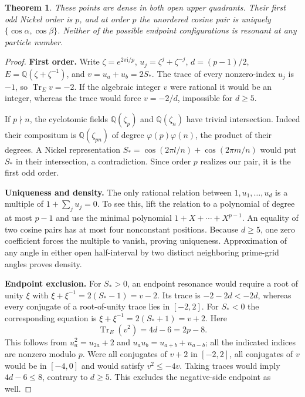 \documentclass[11pt]{article}
\numberwithin{equation}{section}
\newtheorem{theorem}{Theorem}[section]
\theoremstyle{definition}
\newcommand{\ii}{\mathrm i}
\newcommand{\Q}{\mathbb Q}
\begin{document}
\begin{theorem}\label{thm:prime}
These points are dense in both open upper quadrants. Their first
odd Nickel order is $p$, and at order $p$ the unordered cosine
pair is uniquely $\{\cos\alpha,\cos\beta\}$. Neither of the
possible endpoint configurations is resonant at any particle number.
\end{theorem}
\begin{proof}
\noindent\textbf{First order.} Write $\zeta=e^{2\pi\ii/p}$, $u_j=\zeta^j+\zeta^{-j}$,
$d=(p-1)/2$, $E=\Q(\zeta+\zeta^{-1})$, and $v=u_a+u_b=2S_*$.
The trace of every nonzero-index $u_j$ is $-1$, so
$\operatorname{Tr}_E v=-2$. If the algebraic integer $v$ were
rational it would be an integer, whereas the trace would force
$v=-2/d$, impossible for $d\ge5$.

If $p\nmid n$, the cyclotomic fields $\Q(\zeta_p)$ and
$\Q(\zeta_n)$ have trivial intersection. Indeed their compositum
is $\Q(\zeta_{pn})$ of degree $\varphi(p)\varphi(n)$, the product
of their degrees. A Nickel representation
$S_* =\cos(2\pi l/n)+\cos(2\pi m/n)$ would put $S_*$ in their
intersection, a contradiction. Since order $p$ realizes our pair,
it is the first odd order.

\par\smallskip\noindent\textbf{Uniqueness and density.} The only rational relation between $1,u_1,\ldots,u_d$ is a
multiple of $1+\sum_j u_j=0$. To see this, lift the relation to
a polynomial of degree at most $p-1$ and use the minimal
polynomial $1+X+\cdots+X^{p-1}$. An equality of two cosine
pairs has at most four nonconstant positions. Because $d\ge5$,
one zero coefficient forces the multiple to vanish, proving uniqueness.
Approximation of any angle in either open half-interval by two
distinct neighboring prime-grid angles proves density.

\par\smallskip\noindent\textbf{Endpoint exclusion.} For $S_*>0$, an endpoint resonance would require a root of unity
$\xi$ with $\xi+\xi^{-1}=2(S_*-1)=v-2$. Its trace is
$-2-2d<-2d$, whereas every conjugate of a root-of-unity trace lies
in $[-2,2]$. For $S_*<0$ the corresponding equation is
$\xi+\xi^{-1}=2(S_*+1)=v+2$. Here
\[
 \operatorname{Tr}_E(v^2)=4d-6=2p-8.
\]
This follows from $u_a^2=u_{2a}+2$ and
$u_a u_b=u_{a+b}+u_{a-b}$; all the indicated indices are nonzero
modulo $p$. Were all conjugates of $v+2$ in $[-2,2]$, all
conjugates of $v$ would be in $[-4,0]$ and would satisfy
$v^2\le-4v$. Taking traces would imply $4d-6\le8$, contrary
to $d\ge5$. This excludes the negative-side endpoint as well.
\end{proof}
\end{document}
